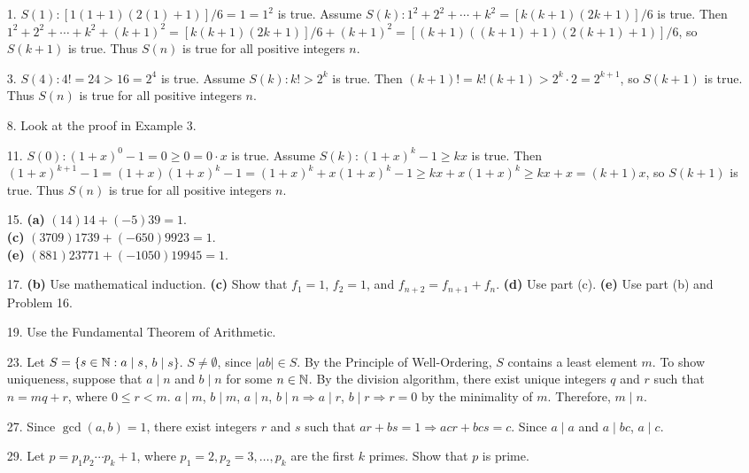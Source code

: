  
{\small
\begin{itemize}
 
 
\bf\item[1.]\rm
$S(1): [1(1+1)(2(1) + 1)]/6 = 1 = 1^2$ is true. Assume $S(k): 1^2 +2^2
+ \cdots + k^2 = [k(k+1)(2k+1)]/6$ is true. Then $1^2 + 2^2 + \cdots +
k^2 + (k+1)^2 = [k(k+1)(2k+1)]/6 + (k+1)^2 = [(k+1)((k+1) +1)(2(k+1) +
1)]/6$, so $S(k+1)$ is true. Thus $S(n)$ is true for all positive
integers $n$. 
 
\bf\item[3.]\rm
$S(4): 4! = 24 > 16 =2^4$ is true. Assume $S(k): k! >2^k$ is true.
Then $(k+1)! = k! (k+1) > 2^k \cdot 2 = 2^{k+1}$, so $S(k+1)$ is true.
Thus $S(n)$ is true for all positive integers $n$. 
 
 
\bf\item[8.]\rm
Look at the proof in Example 3.
 
\bf\item[11.]\rm
$S(0): (1+x)^0 -1 = 0 \geq 0 = 0 \cdot x$ is true. Assume $S(k):
(1+x)^k -1 \geq kx$ is true. Then $(1+x)^{k+1} - 1 = (1+x)(1+x)^k -1 =
(1+x)^k + x(1+x)^k -1 \geq kx + x(1+x)^k \geq kx + x = (k+1)x$, so
$S(k+1)$ is true. Thus $S(n)$ is true for all positive integers $n$.
 
 
\bf\item[15.]\rm
{\bf (a)} $(14)14 + (-5)39 = 1$.\\
{\bf (c)} $(3709) 1739 + (-650) 9923 = 1$.\\
{\bf (e)} $(881) 23771 + (-1050) 19945 = 1$.
 
 
\bf\item[17.]\rm
{\bf (b)} Use mathematical induction.
{\bf (c)} Show that $f_1 = 1$, $f_2 = 1$, and $f_{n + 2}
= f_{n + 1} + f_n$.
{\bf (d)} Use part (c).
{\bf (e)} Use part (b) and Problem 16.
 
 
\bf\item[19.]\rm
Use the Fundamental Theorem of Arithmetic.
 
 
\bf\item[23.]\rm
Let $S = \{s \in {\Bbb N} : a \mid s$, $b \mid s \}$. $S \neq \emptyset$,
since $|ab| \in S$. By the Principle of Well-Ordering, $S$ contains a
least element $m$. To show uniqueness, suppose that $a \mid n$ and $b
\mid n$ for some $n \in {\Bbb N}$. By the division algorithm, there
exist unique integers $q$ and $r$ such that $n = mq + r$, where $0
\leq r < m$. $a \mid m$, $b \mid m$, $a \mid n$, $b \mid n \Rightarrow a
\mid r$, $b \mid r \Rightarrow r = 0$ by the minimality of $m$.
Therefore, $m \mid n$. 
 
 
\bf\item[27.]\rm
Since $\gcd(a,b)=1$, there exist integers $r$ and $s$ such that $ar +
bs =1 \Rightarrow acr+bcs =c$. Since $a \mid a$ and $a \mid bc$, $a
\mid c$.
 
 
\bf\item[29.]\rm
Let $p = p_1 p_2 \cdots p_k + 1$, where $p_1 = 2, p_2 = 3, \ldots,
p_k$ are the first $k$ primes.  Show that $p$ is prime.
 
\end{itemize}
}
 
